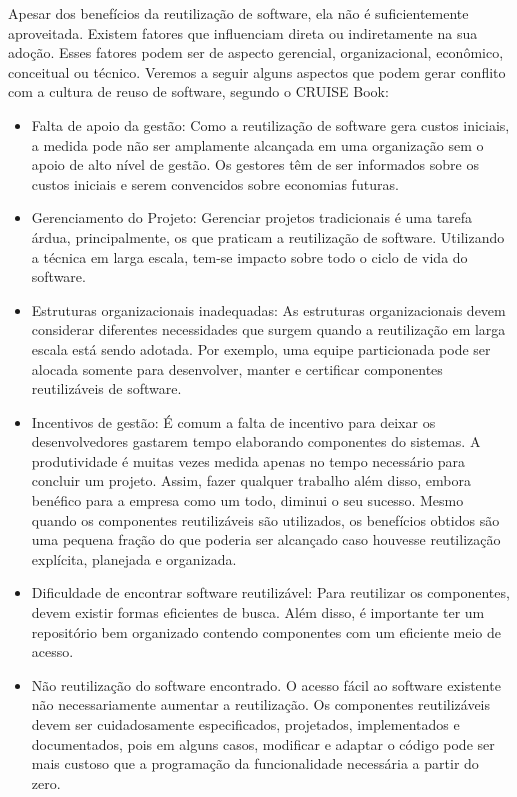 Apesar dos benefícios da reutilização de software, ela não é suficientemente aproveitada. Existem fatores que influenciam direta ou indiretamente na sua adoção. Esses fatores podem ser de aspecto gerencial, organizacional, econômico, conceitual ou técnico. Veremos a seguir alguns aspectos que podem gerar conflito com a cultura de reuso de software, segundo o CRUISE Book:

\begin{itemize}
	
\item Falta de apoio da gestão: Como a reutilização de software gera custos iniciais,
a medida pode não ser amplamente alcançada em uma organização sem o apoio de alto nível de gestão. Os gestores têm de ser informados sobre os custos iniciais e serem convencidos sobre economias futuras.

\item Gerenciamento do Projeto: Gerenciar projetos tradicionais é uma tarefa árdua, principalmente, os que praticam a reutilização de software. Utilizando a técnica em larga escala, tem-se impacto sobre todo o ciclo de vida do software.

\item Estruturas organizacionais inadequadas: As estruturas organizacionais devem
considerar diferentes necessidades que surgem quando a reutilização em larga escala está sendo adotada. Por exemplo, uma equipe particionada pode ser alocada somente para desenvolver, manter e certificar componentes reutilizáveis de software.

\item Incentivos de gestão: É comum a falta de incentivo para deixar os desenvolvedores gastarem tempo elaborando componentes do sistemas. A produtividade é muitas vezes medida apenas no tempo necessário para concluir um projeto. Assim, fazer qualquer trabalho além disso, embora benéfico para a empresa como um todo, diminui o seu sucesso. Mesmo quando os componentes reutilizáveis são utilizados, os benefícios obtidos são uma pequena fração do que poderia ser alcançado caso houvesse reutilização explícita, planejada e organizada.

\item Dificuldade de encontrar software reutilizável: Para reutilizar os componentes, devem existir formas eficientes de busca. Além disso, é importante ter um repositório bem organizado contendo componentes com um eficiente meio de acesso.

\item Não reutilização do software encontrado. O acesso fácil ao software existente
não necessariamente aumentar a reutilização. Os componentes reutilizáveis devem ser cuidadosamente especificados, projetados, implementados e documentados, pois em alguns casos, modificar e adaptar o código  pode ser mais custoso que a programação da funcionalidade necessária a partir do zero.


\end{itemize}
